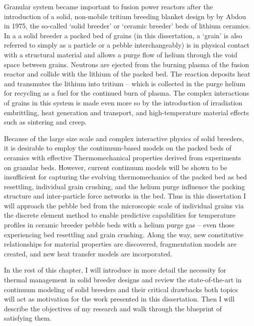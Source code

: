 Granular system became important to fusion power reactors after the introduction of a solid, non-mobile tritium breeding blanket design by by Abdou\etal\cite{Abdou1975} in 1975, the so-called `solid breeder' or `ceramic breeder' beds of lithium ceramics. In a a solid breeder a packed bed of grains (in this dissertation, a `grain' is also referred to simply as a particle or a pebble interchangeably) is in physical contact with a structural material and allows a purge flow of helium through the void space between grains. Neutrons are ejected from the burning plasma of the fusion reactor and collide with the lithium of the packed bed. The reaction deposits heat and transmutes the lithium into tritium -- which is collected in the purge helium for recycling as a fuel for the continued burn of plasma. The complex interactions of grains in this system is made even more so by the introduction of irradiation embrittling, heat generation and transport, and high-temperature material effects such as sintering and creep.

Because of the large size scale and complex interactive physics of solid breeders, it is desirable to employ the continuum-based models on the packed beds of ceramics with effective Thermomechanical properties derived from experiments on granular beds. However, current continuum models will be shown to be insufficient for capturing the evolving thermomechanics of the packed bed as bed resettling, individual grain crushing, and the helium purge influence the packing structure and inter-particle force networks in the bed. Thus in this dissertation I will approach the pebble bed from the microscopic scale of individual grains via the discrete element method to enable predictive capabilities for temperature profiles in ceramic breeder pebble beds with a helium purge gas -- even those experiencing bed resettling and grain crushing. Along the way, new constitutive relationships for material properties are discovered, fragmentation models are created, and new heat transfer models are incorporated.

In the rest of this chapter, I will introduce in more detail the necessity for thermal management in solid breeder designs and review the state-of-the-art in continuum modeling of solid breeders and their critical drawbacks both topics will act as motivation for the work presented in this dissertation. Then I will describe the objectives of my research and walk through the blueprint of satisfying them.


